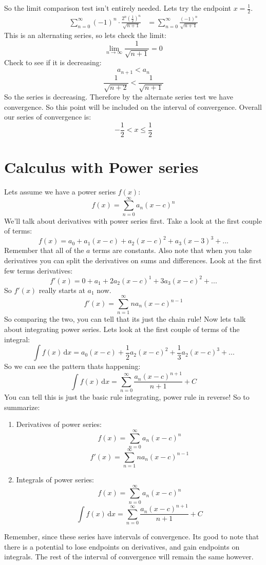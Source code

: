 \documentclass{article}
\begin{document}
        So the limit comparison test isn't entirely needed. 
        Lets try the endpoint \(x = \frac{1}{2}\).
        \begin{align*}
            \sum_{n=0}^{\infty} (-1)^n \cdot \frac{2^n(\frac{1}{2})^n}{\sqrt{n+1}}
            &= \sum_{n=0}^{\infty} \frac{(-1)^n}{\sqrt{n+1}}
        \end{align*}
        This is an alternating series, so lets check the limit:
        \[\lim_{n \to \infty} \frac{1}{\sqrt{n+1}} = 0\]
        Check to see if it is decreasing:
        \[a_{n+1} < a_n\]
        \[\frac{1}{\sqrt{n+2}} < \frac{1}{\sqrt{n+1}}\]
        So the series is decreasing. 
        Therefore by the alternate series test we have convergence.
        So this point will be included on the interval of convergence.
        Overall our series of convergence is:
        \[- \frac{1}{2} < x \leq \frac{1}{2}\]

\section{Calculus with Power series}
    Lets assume we have a power series \(f(x)\):
    \[f(x) = \sum_{n=0}^{\infty} a_n (x-c)^n\]
    We'll talk about derivatives with power series first.
    Take a look at the first couple of terms:
    \[f(x) = a_0 + a_1(x-c) + a_2(x-c)^2 + a_3(x-3)^3 + ...\]
    Remember that all of the \(a\) terms are constants.
    Also note that when you take derivatives you can split the derivatives on sums and differences.
    Look at the first few terms derivatives:
    \[f'(x) = 0 + a_1 + 2a_2(x-c)^1 + 3a_3(x-c)^2 + ...\]
    So \(f'(x)\) really starts at \(a_1\) now.
    \[f'(x) = \sum_{n = 1}^{\infty} na_n(x-c)^{n-1}\]
    So comparing the two, you can tell that its just the chain rule!
    Now lets talk about integrating power series.
    Lets look at the first couple of terms of the integral:
    \[\int f(x) \,\mathrm{d}x = a_0(x-c) + \frac{1}{2}a_2(x-c)^2 + \frac{1}{3}a_2(x-c)^3 + ...\]
    So we can see the pattern thats happening:
    \[\int f(x) \,\mathrm{d}x = \sum_{n=0}^{\infty} \frac{a_n(x-c)^{n+1}}{n+1} + C\]
    You can tell this is just the basic rule integrating, power rule in reverse!
    So to summarize:
    \begin{enumerate}
        \item Derivatives of power series:
        \[f(x) = \sum_{n=0}^{\infty} a_n (x-c)^n\]
        \[f'(x) = \sum_{n = 1}^{\infty} na_n(x-c)^{n-1}\]
        \item Integrals of power series:
        \[f(x) = \sum_{n=0}^{\infty} a_n (x-c)^n\]
        \[\int f(x) \,\mathrm{d}x = \sum_{n=0}^{\infty} \frac{a_n(x-c)^{n+1}}{n+1} + C\]
    \end{enumerate}
    Remember, since these series have intervals of convergence.
    Its good to note that there is a potential to lose endpoints on derivatives, and gain endpoints on integrals.
    The rest of the interval of convergence will remain the same however.
    
\end{document}
